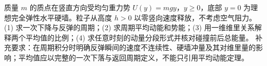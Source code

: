 质量 \(m\) 的质点在竖直方向受均匀重力势 \(U(y)=mgy\)，\(y\ge0\)，底部 \(y=0\) 为理想完全弹性水平硬墙。粒子从高度 \(h>0\) 以零竖向速度释放，不考虑空气阻力。
(1) 求一次下降与反弹的周期；(2) 求周期平均动能和势能；(3) 用一维维里关系解释两个平均值的比例；(4) 求任意时刻的动量分段形式并核对碰撞前后总能量。
补充要求：在周期积分时明确反弹瞬间的速度不连续性、硬墙冲量及其对维里量的影响；平均值应以完整的一次下落与返回周期定义，不能只引用平均动能定理。
